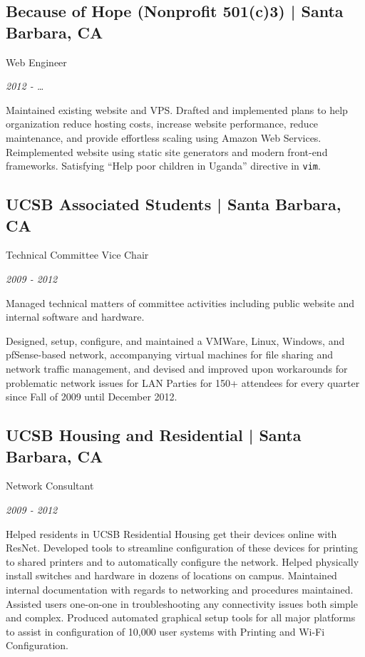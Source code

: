 \documentclass[10pt, letter]{article}
\newcommand{\years}[1]{\marginnote{#1}}
\renewcommand{\years}[1]{{\emph{#1}}}
\begin{document}
\begin{multicols}{2}
\subsection*{Because of Hope (Nonprofit 501(c)3) | {\footnotesize{Santa Barbara, CA}}}

Web Engineer

\years{2012 - \ldots}

Maintained existing website and VPS. Drafted and implemented plans to help
organization reduce hosting costs, increase website performance, reduce
maintenance, and provide effortless scaling using Amazon Web Services.
Reimplemented website using static site generators and modern front-end
frameworks. Satisfying ``Help poor children in Uganda'' directive in \texttt{vim}.

\subsection*{UCSB Associated Students | {\footnotesize{Santa Barbara, CA}}}

Technical Committee Vice Chair

\years{2009 - 2012}

Managed technical matters of committee activities including public website
and internal software and hardware.

Designed, setup, configure, and maintained a VMWare, Linux, Windows, and
pfSense-based network, accompanying virtual machines for file sharing and
network traffic management, and devised and improved upon workarounds for
problematic network issues for LAN Parties for 150+ attendees for every
quarter since Fall of 2009 until December 2012.

\subsection*{UCSB Housing and Residential | {\footnotesize{Santa Barbara, CA}}}

Network Consultant

\years{2009 - 2012}

Helped residents in UCSB Residential Housing get their devices online with
ResNet.  Developed tools to streamline configuration of these devices for
printing to shared printers and to automatically configure the network. Helped
physically install switches and hardware in dozens of locations on campus.
Maintained internal documentation with regards to networking and procedures
maintained. Assisted users one-on-one in troubleshooting any connectivity
issues both simple and complex. Produced automated graphical setup tools for
all major platforms to assist in configuration of 10,000 user systems with
Printing and Wi-Fi Configuration.


\end{multicols}
\end{document}
